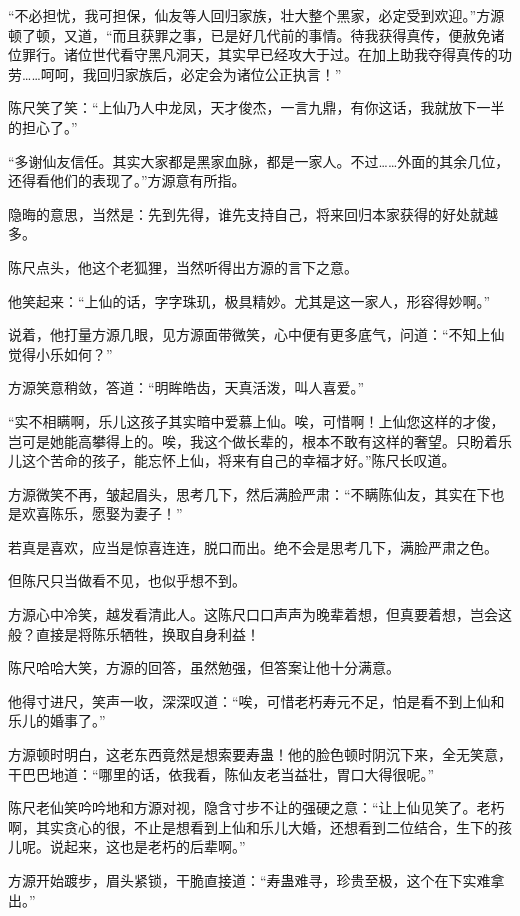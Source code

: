 \begin{this_body}
“不必担忧，我可担保，仙友等人回归家族，壮大整个黑家，必定受到欢迎。”方源顿了顿，又道，“而且获罪之事，已是好几代前的事情。待我获得真传，便赦免诸位罪行。诸位世代看守黑凡洞天，其实早已经攻大于过。在加上助我夺得真传的功劳……呵呵，我回归家族后，必定会为诸位公正执言！”

陈尺笑了笑：“上仙乃人中龙凤，天才俊杰，一言九鼎，有你这话，我就放下一半的担心了。”

“多谢仙友信任。其实大家都是黑家血脉，都是一家人。不过……外面的其余几位，还得看他们的表现了。”方源意有所指。

隐晦的意思，当然是：先到先得，谁先支持自己，将来回归本家获得的好处就越多。

陈尺点头，他这个老狐狸，当然听得出方源的言下之意。

他笑起来：“上仙的话，字字珠玑，极具精妙。尤其是这一家人，形容得妙啊。”

说着，他打量方源几眼，见方源面带微笑，心中便有更多底气，问道：“不知上仙觉得小乐如何？”

方源笑意稍敛，答道：“明眸皓齿，天真活泼，叫人喜爱。”

“实不相瞒啊，乐儿这孩子其实暗中爱慕上仙。唉，可惜啊！上仙您这样的才俊，岂可是她能高攀得上的。唉，我这个做长辈的，根本不敢有这样的奢望。只盼着乐儿这个苦命的孩子，能忘怀上仙，将来有自己的幸福才好。”陈尺长叹道。

方源微笑不再，皱起眉头，思考几下，然后满脸严肃：“不瞒陈仙友，其实在下也是欢喜陈乐，愿娶为妻子！”

若真是喜欢，应当是惊喜连连，脱口而出。绝不会是思考几下，满脸严肃之色。

但陈尺只当做看不见，也似乎想不到。

方源心中冷笑，越发看清此人。这陈尺口口声声为晚辈着想，但真要着想，岂会这般？直接是将陈乐牺牲，换取自身利益！

陈尺哈哈大笑，方源的回答，虽然勉强，但答案让他十分满意。

他得寸进尺，笑声一收，深深叹道：“唉，可惜老朽寿元不足，怕是看不到上仙和乐儿的婚事了。”

方源顿时明白，这老东西竟然是想索要寿蛊！他的脸色顿时阴沉下来，全无笑意，干巴巴地道：“哪里的话，依我看，陈仙友老当益壮，胃口大得很呢。”

陈尺老仙笑吟吟地和方源对视，隐含寸步不让的强硬之意：“让上仙见笑了。老朽啊，其实贪心的很，不止是想看到上仙和乐儿大婚，还想看到二位结合，生下的孩儿呢。说起来，这也是老朽的后辈啊。”

方源开始踱步，眉头紧锁，干脆直接道：“寿蛊难寻，珍贵至极，这个在下实难拿出。”


\end{this_body}
